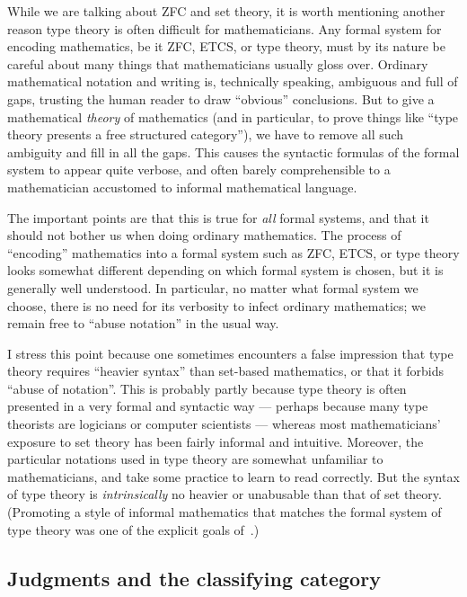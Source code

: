 \documentclass[10pt]{article}
\numberwithin{equation}{section}
\begin{document}
While we are talking about ZFC and set theory, it is worth mentioning another reason type theory is often difficult for mathematicians.
Any formal system for encoding mathematics, be it ZFC, ETCS, or type theory, must by its nature be careful about many things that mathematicians usually gloss over.
Ordinary mathematical notation and writing is, technically speaking, ambiguous and full of gaps, trusting the human reader to draw ``obvious'' conclusions.
But to give a mathematical \emph{theory} of mathematics (and in particular, to prove things like ``type theory presents a free structured category''), we have to remove all such ambiguity and fill in all the gaps.
This causes the syntactic formulas of the formal system to appear quite verbose, and often barely comprehensible to a mathematician accustomed to informal mathematical language.

The important points are that this is true for \emph{all} formal systems, and that it should not bother us when doing ordinary mathematics.
The process of ``encoding'' mathematics into a formal system such as ZFC, ETCS, or type theory looks somewhat different depending on which formal system is chosen, but it is generally well understood.
In particular, no matter what formal system we choose, there is no need for its verbosity to infect ordinary mathematics; we remain free to ``abuse notation'' in the usual way.

I stress this point because one sometimes encounters a false impression that type theory requires ``heavier syntax'' than set-based mathematics, or that it forbids ``abuse of notation''.
This is probably partly because type theory is often presented in a very formal and syntactic way --- perhaps because many type theorists are logicians or computer scientists --- whereas most mathematicians' exposure to set theory has been fairly informal and intuitive.
Moreover, the particular notations used in type theory are somewhat unfamiliar to mathematicians, and take some practice to learn to read correctly.
But the syntax of type theory is \emph{intrinsically} no heavier or unabusable than that of set theory.
(Promoting a style of informal mathematics that matches the formal system of type theory was one of the explicit goals of~\cite{hottbook}.)


\subsection{Judgments and the classifying category}
\label{sec:type-term-judgments}
\end{document}
